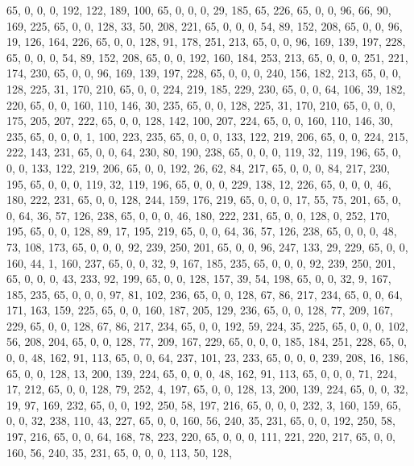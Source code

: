 \begin{DoxyCode}
       65, 0, 0, 0, 192, 122, 189, 100, 65, 0, 0, 0, 29, 185, 65, 226, 65, 0, 0, 96, 66, 90, 169, 225, 65, 0, 0,
       128, 33, 50, 208, 221, 65, 0, 0, 0, 54, 89, 152, 208, 65, 0, 0, 96, 19, 126, 164, 226, 65, 0, 0, 128, 91, 178,
       251, 213, 65, 0, 0, 96, 169, 139, 197, 228, 65, 0, 0, 0, 54, 89, 152, 208, 65, 0, 0, 192, 160, 184, 253,
       213, 65, 0, 0, 0, 251, 221, 174, 230, 65, 0, 0, 96, 169, 139, 197, 228, 65, 0, 0, 0, 240, 156, 182, 213, 65, 0,
       0, 128, 225, 31, 170, 210, 65, 0, 0, 224, 219, 185, 229, 230, 65, 0, 0, 64, 106, 39, 182, 220, 65, 0, 0,
       160, 110, 146, 30, 235, 65, 0, 0, 128, 225, 31, 170, 210, 65, 0, 0, 0, 175, 205, 207, 222, 65, 0, 0, 128, 142,
       100, 207, 224, 65, 0, 0, 160, 110, 146, 30, 235, 65, 0, 0, 0, 1, 100, 223, 235, 65, 0, 0, 0, 133, 122, 219,
       206, 65, 0, 0, 224, 215, 222, 143, 231, 65, 0, 0, 64, 230, 80, 190, 238, 65, 0, 0, 0, 119, 32, 119, 196,
       65, 0, 0, 0, 133, 122, 219, 206, 65, 0, 0, 192, 26, 62, 84, 217, 65, 0, 0, 0, 84, 217, 230, 195, 65, 0, 0, 0,
       119, 32, 119, 196, 65, 0, 0, 0, 229, 138, 12, 226, 65, 0, 0, 0, 46, 180, 222, 231, 65, 0, 0, 128, 244, 159,
       176, 219, 65, 0, 0, 0, 17, 55, 75, 201, 65, 0, 0, 64, 36, 57, 126, 238, 65, 0, 0, 0, 46, 180, 222, 231, 65,
       0, 0, 128, 0, 252, 170, 195, 65, 0, 0, 128, 89, 17, 195, 219, 65, 0, 0, 64, 36, 57, 126, 238, 65, 0, 0, 0,
       48, 73, 108, 173, 65, 0, 0, 0, 92, 239, 250, 201, 65, 0, 0, 96, 247, 133, 29, 229, 65, 0, 0, 160, 44, 1, 160,
       237, 65, 0, 0, 32, 9, 167, 185, 235, 65, 0, 0, 0, 92, 239, 250, 201, 65, 0, 0, 0, 43, 233, 92, 199, 65, 0,
       0, 128, 157, 39, 54, 198, 65, 0, 0, 32, 9, 167, 185, 235, 65, 0, 0, 0, 97, 81, 102, 236, 65, 0, 0, 128, 67,
       86, 217, 234, 65, 0, 0, 64, 171, 163, 159, 225, 65, 0, 0, 160, 187, 205, 129, 236, 65, 0, 0, 128, 77, 209,
       167, 229, 65, 0, 0, 128, 67, 86, 217, 234, 65, 0, 0, 192, 59, 224, 35, 225, 65, 0, 0, 0, 102, 56, 208, 204,
       65, 0, 0, 128, 77, 209, 167, 229, 65, 0, 0, 0, 185, 184, 251, 228, 65, 0, 0, 0, 48, 162, 91, 113, 65, 0, 0,
       64, 237, 101, 23, 233, 65, 0, 0, 0, 239, 208, 16, 186, 65, 0, 0, 128, 13, 200, 139, 224, 65, 0, 0, 0, 48,
       162, 91, 113, 65, 0, 0, 0, 71, 224, 17, 212, 65, 0, 0, 128, 79, 252, 4, 197, 65, 0, 0, 128, 13, 200, 139, 224,
       65, 0, 0, 32, 19, 97, 169, 232, 65, 0, 0, 192, 250, 58, 197, 216, 65, 0, 0, 0, 232, 3, 160, 159, 65, 0, 0,
       32, 238, 110, 43, 227, 65, 0, 0, 160, 56, 240, 35, 231, 65, 0, 0, 192, 250, 58, 197, 216, 65, 0, 0, 64, 168,
       78, 223, 220, 65, 0, 0, 0, 111, 221, 220, 217, 65, 0, 0, 160, 56, 240, 35, 231, 65, 0, 0, 0, 113, 50, 128,

\end{DoxyCode}

